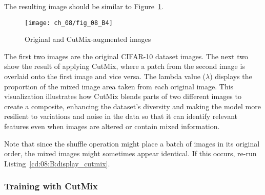 The resulting image should be similar to Figure~\ref{fig:08:B:4}.

\begin{figure}[H]
    \texttt{[image: ch\_08/fig\_08\_B4]}
    \caption{Original and CutMix-augmented images}
    \label{fig:08:B:4}
\end{figure}

The first two images are the original CIFAR-10 dataset images. The next two show the result of applying CutMix, where a patch from the second image is overlaid onto the first image and vice versa. The lambda value ($\lambda$) displays the proportion of the mixed image area taken from each original image. This visualization  illustrates how CutMix blends parts of two different images to create a composite, enhancing the dataset's diversity and making the model more resilient to variations and noise in the data so that it can identify  relevant features even when images are altered or contain mixed information.

Note that since the shuffle operation might place a batch of images in its original order, the mixed images might sometimes appear identical. If this occurs, re-run Listing~\ref{cd:08:B:display_cutmix}.

\subsubsection{Training with CutMix}

